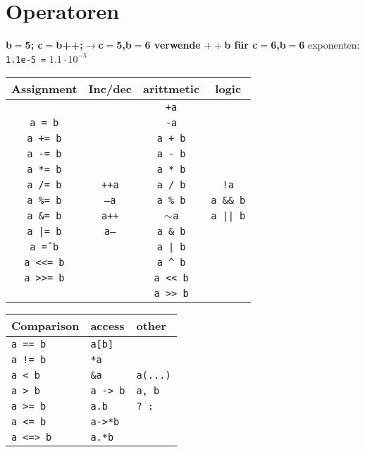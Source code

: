 \section{Operatoren}
\textbf{b$=$5; c$=$b++;$\rightarrow$c$=$5,b$=$6 verwende $++$b für c$=$6,b$=$6}
\qquad exponenten: \texttt{1.1e-5 =} $1.1\cdot10^{-5}$
\begin{center}
	\begin{tabular*}{\columnwidth}{ |c @{\extracolsep{\fill}}|c|c|c| } 
		\hline
			Assignment		&	Inc/dec		&	arittmetic		&			logic		\\
		\hline\hline
							& 				&\texttt{+a}		&  						\\
		\texttt{a = b} 		& 				&\texttt{-a}		&						\\
		\texttt{a += b} 	& 				&\texttt{a + b}		&						\\
		\texttt{a -= b} 	& 				&\texttt{a - b}		&						\\
		\texttt{a *= b} 	& 				&\texttt{a * b}		&						\\
		\texttt{a /= b} 	&\texttt{++a}	&\texttt{a / b}		&\texttt{!a}			\\
		\texttt{a \%= b}	&\texttt{--a}	&\texttt{a \% b}	&\texttt{a \&\& b}		\\
		\texttt{a \&= b}	&\texttt{a++}	&\texttt{$\sim$a} 	&\texttt{a || b}		\\
		\texttt{a |= b}		&\texttt{a--}	&\texttt{a \& b}	&						\\
		\texttt{a \^ = b}	& 				&\texttt{a | b}		&						\\
		\texttt{a <<= b} 	& 				&\texttt{a \^{} b}	&						\\
		\texttt{a >>= b} 	& 				&\texttt{a << b}	&						\\
						 	&  				&\texttt{a >> b}	&						\\
	\hline
	\end{tabular*}

	\begin{tabularx}{\columnwidth}{|X|X|X|}
		\hline
		Comparison			&	access				&	other		\\
		\hline\hline
		\texttt{a == b} 	&\texttt{a[b]} 			&				\\
		\texttt{a != b} 	&\texttt{*a} 			&				\\
		\texttt{a < b} 		&\texttt{\&a} 			&\texttt{a(...)}\\
		\texttt{a > b} 		&\texttt{a -> b} 		&\texttt{a, b}	\\
		\texttt{a >= b} 	&\texttt{a.b} 			&\texttt{? :}	\\
		\texttt{a <= b} 	&\texttt{a->*b} 		&				\\
		\texttt{a <=> b} 	&\texttt{a.*b} 			&				\\
		\hline
	\end{tabularx}
\end{center}

